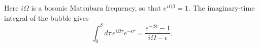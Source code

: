 \documentclass{article}
\begin{document}
Here $i\Omega$ is a bosonic Matsubara frequency, so that $e^{i\Omega\beta} = 1$. The imaginary-time integral of the bubble gives
\begin{equation}
\int_0^{\beta} d\tau\, e^{i\Omega\tau} e^{-\epsilon\tau} = \frac{e^{-\beta\epsilon}-1}{i\Omega-\epsilon} .
\label{eq:bub}
\end{equation}
\end{document}
